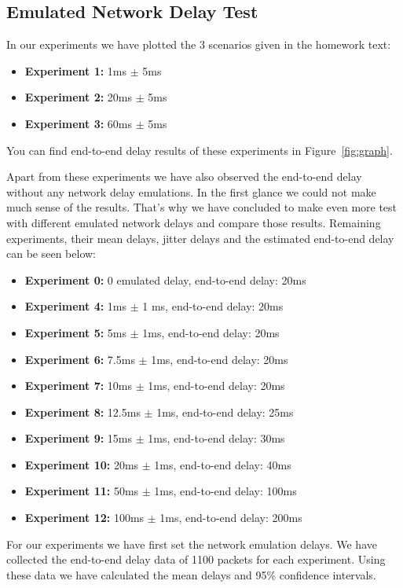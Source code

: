 \documentclass[conference]{IEEEtran}
\begin{document}
\subsection{Emulated Network Delay Test}\label{AA}

In our experiments we have plotted the 3 scenarios given in the homework text:

\begin{itemize}
    \item \textbf{Experiment 1:} 1ms $\pm$ 5ms
    \item \textbf{Experiment 2:} 20ms $\pm$ 5ms
    \item \textbf{Experiment 3:} 60ms $\pm$ 5ms
\end{itemize}
You can find end-to-end delay results of these experiments in Figure~\ref{fig:graph}.

Apart from these experiments we have also observed the end-to-end delay without any network delay emulations. In the first glance we could not make much sense of the results. That's why we have concluded to  make even more test with different emulated network delays and compare those results. Remaining experiments, their mean delays, jitter delays and the estimated end-to-end delay can be seen below:

\begin{itemize}
    \item \textbf{Experiment 0:} 0 emulated delay, end-to-end delay: 20ms
    \item \textbf{Experiment 4:} 1ms $\pm$ 1 ms, end-to-end delay: 20ms
    \item \textbf{Experiment 5:} 5ms $\pm$ 1ms, end-to-end delay: 20ms
    \item \textbf{Experiment 6:} 7.5ms $\pm$ 1ms, end-to-end delay: 20ms
    \item \textbf{Experiment 7:} 10ms $\pm$ 1ms, end-to-end delay: 20ms
    \item \textbf{Experiment 8:} 12.5ms $\pm$ 1ms, end-to-end delay: 25ms
    \item \textbf{Experiment 9:} 15ms $\pm$ 1ms, end-to-end delay: 30ms
    \item \textbf{Experiment 10:} 20ms $\pm$ 1ms, end-to-end delay: 40ms
    \item \textbf{Experiment 11:} 50ms $\pm$ 1ms, end-to-end delay: 100ms
    \item \textbf{Experiment 12:} 100ms $\pm$ 1ms, end-to-end delay: 200ms
\end{itemize}

For our experiments we have first set the network emulation delays. We have collected the end-to-end delay data of 1100 packets for each experiment. Using these data we have calculated the mean delays and 95\% confidence intervals.
\end{document}
